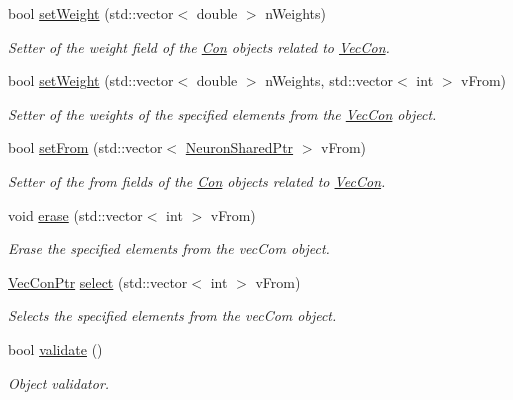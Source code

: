 \begin{DoxyCompactItemize}
bool \hyperlink{classvec_con_aed79ead4c7a01a8e34e5ed69da74e877}{setWeight} (std::vector$<$ double $>$ nWeights)
\begin{DoxyCompactList}\small\item\em Setter of the weight field of the \hyperlink{class_con}{Con} objects related to \hyperlink{classvec_con}{VecCon}. \end{DoxyCompactList}\item 
bool \hyperlink{classvec_con_a89a39247b0188b4fcc473c430ad46d4c}{setWeight} (std::vector$<$ double $>$ nWeights, std::vector$<$ int $>$ vFrom)
\begin{DoxyCompactList}\small\item\em Setter of the weights of the specified elements from the \hyperlink{classvec_con}{VecCon} object. \end{DoxyCompactList}\item 
bool \hyperlink{classvec_con_aa5ab6f399819f3a4ac0ba85adc1eb8d2}{setFrom} (std::vector$<$ \hyperlink{_a_m_o_r_e_8h_a03051950b0faf9499d14cf376e04c329}{NeuronSharedPtr} $>$ vFrom)
\begin{DoxyCompactList}\small\item\em Setter of the from fields of the \hyperlink{class_con}{Con} objects related to \hyperlink{classvec_con}{VecCon}. \end{DoxyCompactList}\item 
void \hyperlink{classvec_con_aa9cc2fde90ddf466e820f929ead4fb0b}{erase} (std::vector$<$ int $>$ vFrom)
\begin{DoxyCompactList}\small\item\em Erase the specified elements from the vecCom object. \end{DoxyCompactList}\item 
\hyperlink{_a_m_o_r_e_8h_a16f0806a3e5478c590c5b8ac41187e57}{VecConPtr} \hyperlink{classvec_con_a19b101dd0dcd24587a393a1eaa80dad0}{select} (std::vector$<$ int $>$ vFrom)
\begin{DoxyCompactList}\small\item\em Selects the specified elements from the vecCom object. \end{DoxyCompactList}\item 
bool \hyperlink{classvec_con_a7dc281e7258bf8be19a1591501c5434d}{validate} ()
\begin{DoxyCompactList}\small\item\em Object validator. \end{DoxyCompactList}\end{DoxyCompactItemize}


